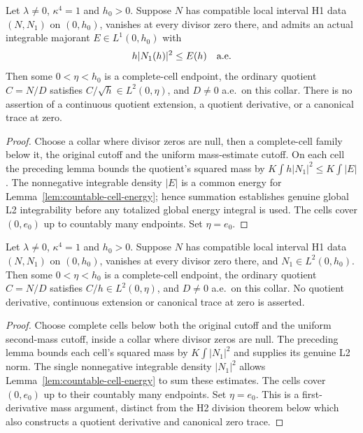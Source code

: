 \begin{lemma}
\label{lem:phase-cell-mass-division}
\leanok
Let $\lambda\ne0$, $\kappa^4=1$ and $h_0>0$.
Suppose $N$ has compatible local interval H1 data $(N,N_1)$ on
$(0,h_0)$, vanishes at every divisor zero there, and admits an actual
integrable majorant $E\in L^1(0,h_0)$ with
\[
 h|N_1(h)|^2\le E(h)\quad\hbox{a.e.}
\]
Then some $0<\eta<h_0$ is a complete-cell endpoint, the ordinary
quotient $C=N/D$ satisfies $C/\sqrt h\in L^2(0,\eta)$, and
$D\ne0$ a.e.\ on this collar.
There is no assertion of a continuous quotient extension, a quotient
derivative, or a canonical trace at zero.
\end{lemma}

\begin{proof}
\leanok
Choose a collar where divisor zeros are null, then a complete-cell
family below it, the original cutoff and the uniform mass-estimate cutoff.
On each cell the preceding lemma bounds the quotient's squared mass
by $K\int h|N_1|^2\le K\int|E|$.
The nonnegative integrable density $|E|$ is a common energy for
Lemma~\ref{lem:countable-cell-energy}; hence summation establishes
genuine global L2 integrability before any totalized global energy
integral is used. The cells cover $(0,e_0)$ up to countably many
endpoints. Set $\eta=e_0$.
\end{proof}

\begin{lemma}
\label{lem:phase-cell-second-mass-division}
\leanok
Let $\lambda\ne0$, $\kappa^4=1$ and $h_0>0$.
Suppose $N$ has compatible local interval H1 data $(N,N_1)$ on
$(0,h_0)$, vanishes at every divisor zero there, and
$N_1\in L^2(0,h_0)$.
Then some $0<\eta<h_0$ is a complete-cell endpoint, the ordinary
quotient $C=N/D$ satisfies $C/h\in L^2(0,\eta)$, and
$D\ne0$ a.e.\ on this collar.
No quotient derivative, continuous extension or canonical trace at zero
is asserted.
\end{lemma}

\begin{proof}
\leanok
Choose complete cells below both the original cutoff and the uniform
second-mass cutoff, inside a collar where divisor zeros are null.
The preceding lemma bounds each cell's squared mass by
$K\int|N_1|^2$ and supplies its genuine L2 norm.
The single nonnegative integrable density $|N_1|^2$ allows
Lemma~\ref{lem:countable-cell-energy} to sum these estimates.
The cells cover $(0,e_0)$ up to their countably many endpoints.
Set $\eta=e_0$. This is a first-derivative mass argument, distinct from
the H2 division theorem below which also constructs a quotient derivative
and canonical zero trace.
\end{proof}

